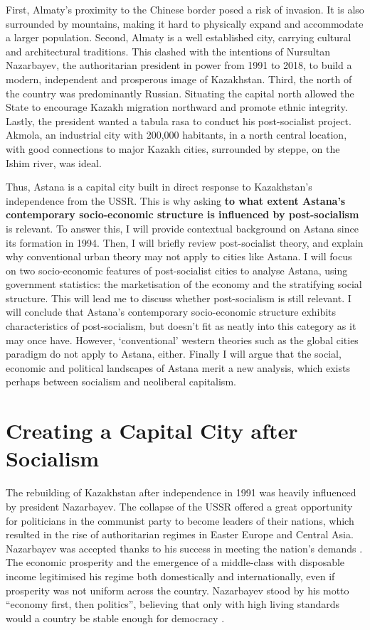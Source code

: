 \documentclass{article}
\begin{document}
First, Almaty's proximity to the Chinese border posed a risk of invasion. It is also surrounded by mountains, making it hard to physically expand and accommodate a larger population. 
Second, Almaty is a well established city, carrying cultural and architectural traditions. This clashed with the intentions of Nursultan Nazarbayev, the authoritarian president in power from 1991 to 2018, to build a modern, independent and prosperous image of Kazakhstan. 
Third, the north of the country was predominantly Russian. Situating the capital north allowed the State to encourage Kazakh migration northward and promote ethnic integrity.
Lastly, the president wanted a tabula rasa to conduct his post-socialist project. Akmola, an industrial city with 200,000 habitants, in a north central location, with good connections to major Kazakh cities, surrounded by steppe, on the Ishim river, was ideal.

Thus, Astana is a capital city built in direct response to Kazakhstan's independence from the USSR. This is why asking \textbf{to what extent Astana's contemporary socio-economic structure is influenced by post-socialism} is relevant. 
To answer this, I will provide contextual background on Astana since its formation in 1994. Then, I will briefly review post-socialist theory, and explain why conventional urban theory may not apply to cities like Astana. 
I will focus on two socio-economic features of post-socialist cities to analyse Astana, using government statistics: the marketisation of the economy and the stratifying social structure.
This will lead me to discuss whether post-socialism is still relevant. I will conclude that Astana's contemporary socio-economic structure exhibits characteristics of post-socialism, but doesn't fit as neatly into this category as it may once have. 
However, `conventional' western theories such as the global cities paradigm do not apply to Astana, either. 
Finally I will argue that the social, economic and political landscapes of Astana merit a new analysis, which exists perhaps between socialism and neoliberal capitalism.

\section{Creating a Capital City after Socialism}

The rebuilding of Kazakhstan after independence in 1991 was heavily influenced by president Nazarbayev. The collapse of the USSR offered a great opportunity for politicians in the communist party to become leaders of their nations, which resulted in the rise of authoritarian regimes in Easter Europe and Central Asia. Nazarbayev was accepted thanks to his success in meeting the nation's demands \parencite{isaacs2010papa}. The economic prosperity and the emergence of a middle-class with disposable income legitimised his regime both domestically and internationally, even if prosperity was not uniform across the country. Nazarbayev stood by his motto ``economy first, then politics'', believing that only with high living standards would a country be stable enough for democracy \parencite{kassymbekov_2020}.
\end{document}
